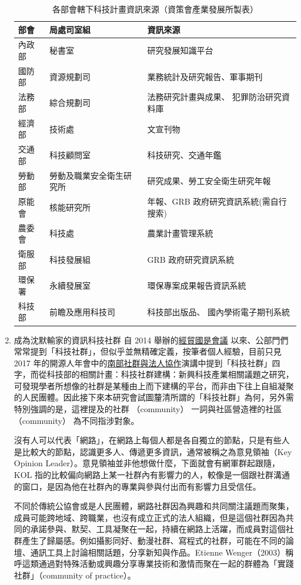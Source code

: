 \documentclass[12pt,a4paper]{article}
\begin{document}
\begin{enumerate}
\begin{table}[htbp]
\caption{\label{tab:org8e7ffaf}
各部會轄下科技計畫資訊來源（資策會產業發展所製表）}
\centering
\begin{tabular}{lll}
\toprule
部會 & 局處司室組 & 資訊來源\\
\midrule
內政部 & 秘書室 & 研究發展知識平台\\
國防部 & 資源規劃司 & 業務統計及研究報告、軍事期刊\\
法務部 & 綜合規劃司 & 法務研究計畫與成果、 犯罪防治研究資料庫\\
經濟部 & 技術處 & 文宣刊物\\
交通部 & 科技顧問室 & 科技研究、交通年鑑\\
勞動部 & 勞動及職業安全衛生研究所 & 研究成果、勞工安全衛生研究年報\\
原能會 & 核能研究所 & 年報、GRB 政府研究資訊系統(需自行搜索)\\
農委會 & 科技處 & 農業計畫管理系統\\
衛服部 & 科技發展組 & GRB 政府研究資訊系統\\
環保署 & 永續發展室 & 環保專案成果報告資訊系統\\
科技部 & 前瞻及應用科技司 & 科技部出版品、 國內學術電子期刊系統\\
\bottomrule
\end{tabular}
\end{table}
\item 成為沈默輸家的資訊科技社群
\label{sec:org47ee537}
自 2014 舉辦的\href{https://www.ndc.gov.tw/Content\_List.aspx?n=F6A29549FD03E057}{經貿國是會議} 以來、公部門們常常提到「科技社群」，但似乎並無精確定義，按筆者個人經驗，目前只見 2017 年的開源人年會中的\href{https://www.youtube.com/watch?v=mrMsNItdkNs}{南部社群與法人協作}演講中提到「科技社群」四字，而從科技部的相關計畫：科技社群建構：新興科技產業相關議題之研究，可發現學者所想像的社群是某種由上而下建構的平台，而非由下往上自組凝聚的人民團體。因此接下來本研究會試圖釐清所謂的「科技社群」為何，另外需特別強調的是，這裡提及的社群 （community） 一詞與社區營造裡的社區 （community） 為不同指涉對象。

沒有人可以代表「網路」，在網路上每個人都是各自獨立的節點，只是有些人是比較大的節點，認識更多人、傳遞更多資訊，通常被稱之為意見領袖（Key Opinion Leader）。意見領袖並非他想做什麼，下面就會有網軍群起跟隨，KOL 指的比較偏向網路上某一社群內有影響力的人，較像是一個跟社群溝通的窗口，是因為他在社群內的專業與參與付出而有影響力且受信任。

不同於傳統公協會或是人民團體，網路社群因為興趣和共同關注議題而聚集，成員可能跨地域、跨職業，也沒有成立正式的法人組織，但是這個社群因為共同的承諾參與、默契、工具凝聚在一起，持續在網路上活躍，而成員對這個社群產生了歸屬感。例如攝影同好、動漫社群、寫程式的社群，可能在不同的論壇、通訊工具上討論相關話題，分享新知與作品。Etienne Wenger（2003）稱呼這類通過對特殊活動或興趣分享專業技術和激情而聚在一起的群體為「實踐社群」（community of practice）。


\end{enumerate}
\end{document}
